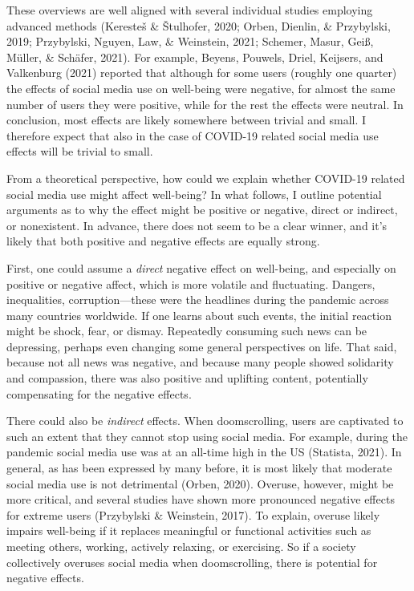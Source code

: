 \documentclass[
  english,
  man,mask,floatsintext]{apa6}
\begin{document}
These overviews are well aligned with several individual studies employing advanced methods (Keresteš \& Štulhofer, 2020; Orben, Dienlin, \& Przybylski, 2019; Przybylski, Nguyen, Law, \& Weinstein, 2021; Schemer, Masur, Geiß, Müller, \& Schäfer, 2021).
For example, Beyens, Pouwels, Driel, Keijsers, and Valkenburg (2021) reported that although for some users (roughly one quarter) the effects of social media use on well-being were negative, for almost the same number of users they were positive, while for the rest the effects were neutral.
In conclusion, most effects are likely somewhere between trivial and small.
I therefore expect that also in the case of COVID-19 related social media use effects will be trivial to small.

From a theoretical perspective, how could we explain whether COVID-19 related social media use might affect well-being?
In what follows, I outline potential arguments as to why the effect might be positive or negative, direct or indirect, or nonexistent.
In advance, there does not seem to be a clear winner, and it's likely that both positive and negative effects are equally strong.

First, one could assume a \emph{direct} negative effect on well-being, and especially on positive or negative affect, which is more volatile and fluctuating.
Dangers, inequalities, corruption---these were the headlines during the pandemic across many countries worldwide.
If one learns about such events, the initial reaction might be shock, fear, or dismay.
Repeatedly consuming such news can be depressing, perhaps even changing some general perspectives on life.
That said, because not all news was negative, and because many people showed solidarity and compassion, there was also positive and uplifting content, potentially compensating for the negative effects.

There could also be \emph{indirect} effects.
When doomscrolling, users are captivated to such an extent that they cannot stop using social media.
For example, during the pandemic social media use was at an all-time high in the US (Statista, 2021).
In general, as has been expressed by many before, it is most likely that moderate social media use is not detrimental (Orben, 2020).
Overuse, however, might be more critical, and several studies have shown more pronounced negative effects for extreme users (Przybylski \& Weinstein, 2017).
To explain, overuse likely impairs well-being if it replaces meaningful or functional activities such as meeting others, working, actively relaxing, or exercising.
So if a society collectively overuses social media when doomscrolling, there is potential for negative effects.
\end{document}
